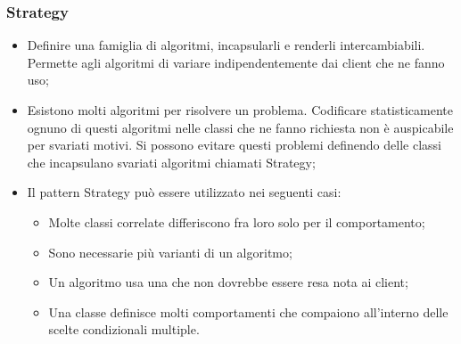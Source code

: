 \subsubsection{Strategy}
\begin{itemize}
\item {} Definire una famiglia di algoritmi, incapsularli e renderli intercambiabili. Permette agli algoritmi di variare indipendentemente dai client che ne fanno uso;
\item {} Esistono molti algoritmi per risolvere un problema. Codificare statisticamente ognuno di questi algoritmi nelle classi che ne fanno richiesta non è auspicabile per svariati motivi. Si possono evitare questi problemi definendo delle classi che incapsulano svariati algoritmi chiamati Strategy;
\item {} Il pattern Strategy può essere utilizzato nei seguenti casi:
\begin{itemize}
\item Molte classi correlate differiscono fra loro solo per il comportamento;
\item Sono necessarie più varianti di un algoritmo;
\item Un algoritmo usa una  che non dovrebbe essere resa nota ai client;
\item Una classe definisce molti comportamenti che compaiono all'interno delle scelte condizionali multiple.
\end{itemize}
\end{itemize}



